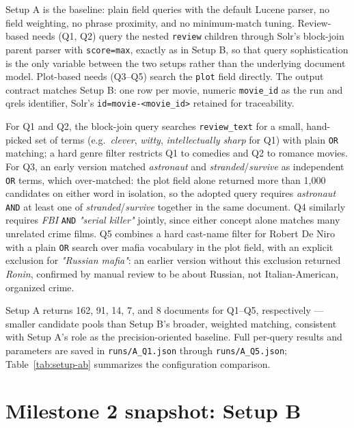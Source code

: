 \documentclass[sigconf]{acmart}
\begin{document}
Setup A is the baseline: plain field queries with the default Lucene parser, no
field weighting, no phrase proximity, and no minimum-match tuning. Review-based
needs (Q1, Q2) query the nested \texttt{review} children through Solr's block-join
parent parser with \texttt{score=max}, exactly as in Setup B, so that query
sophistication is the only variable between the two setups rather than the
underlying document model. Plot-based needs (Q3--Q5) search the \texttt{plot} field
directly. The output contract matches Setup B: one row per movie, numeric
\texttt{movie\_id} as the run and qrels identifier, Solr's \texttt{id=movie-<movie\_id>}
retained for traceability.

For Q1 and Q2, the block-join query searches \texttt{review\_text} for a small,
hand-picked set of terms (e.g.\ \textit{clever}, \textit{witty},
\textit{intellectually sharp} for Q1) with plain \texttt{OR} matching; a hard genre
filter restricts Q1 to comedies and Q2 to romance movies. For Q3, an early version
matched \textit{astronaut} and \textit{stranded}/\textit{survive} as independent
\texttt{OR} terms, which over-matched: the plot field alone returned more than
1{,}000 candidates on either word in isolation, so the adopted query requires
\textit{astronaut} \texttt{AND} at least one of \textit{stranded}/\textit{survive}
together in the same document. Q4 similarly requires \textit{FBI} \texttt{AND}
\textit{"serial killer"} jointly, since either concept alone matches many unrelated
crime films. Q5 combines a hard cast-name filter for Robert De Niro with a plain
\texttt{OR} search over mafia vocabulary in the plot field, with an explicit
exclusion for \textit{"Russian mafia"}: an earlier version without this exclusion
returned \textit{Ronin}, confirmed by manual review to be about Russian, not
Italian-American, organized crime.

Setup A returns 162, 91, 14, 7, and 8 documents for Q1--Q5, respectively ---
smaller candidate pools than Setup B's broader, weighted matching, consistent with
Setup A's role as the precision-oriented baseline. Full per-query results and
parameters are saved in \texttt{runs/A\_Q1.json} through \texttt{runs/A\_Q5.json};
Table~\ref{tab:setup-ab} summarizes the configuration comparison.


\section{Milestone 2 snapshot: Setup B}
\end{document}
